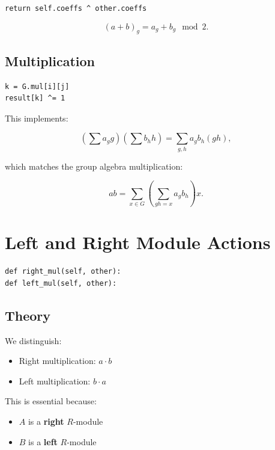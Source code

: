 \documentclass[11pt]{article}
\begin{document}
\begin{verbatim}
return self.coeffs ^ other.coeffs
\end{verbatim}

\begin{equation}
(a + b)_g = a_g + b_g \mod 2.
\end{equation}

\subsection{Multiplication}

\begin{verbatim}
k = G.mul[i][j]
result[k] ^= 1
\end{verbatim}

This implements:

\begin{equation}
\left(\sum a_g g\right)\left(\sum b_h h\right)
=\sum_{g,h} a_g b_h (g h),
\end{equation}

which matches the group algebra multiplication:

\begin{equation}
ab = \sum_{x \in G} \left( \sum_{gh = x} a_g b_h \right) x.
\end{equation}

\section{Left and Right Module Actions}

\begin{verbatim}
def right_mul(self, other):
def left_mul(self, other):
\end{verbatim}

\subsection{Theory}

We distinguish:
\begin{itemize}
\item Right multiplication: $a \cdot b$
\item Left multiplication: $b \cdot a$
\end{itemize}

This is essential because:
\begin{itemize}
\item $A$ is a \textbf{right} $R$-module
\item $B$ is a \textbf{left} $R$-module
\end{itemize}
\end{document}
